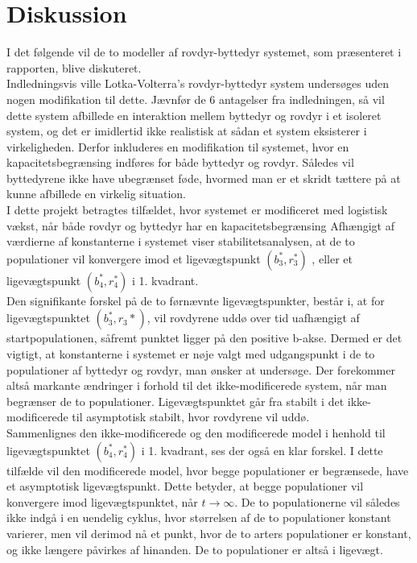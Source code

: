 \chapter{Diskussion}
I det følgende vil de to modeller af rovdyr-byttedyr systemet, som præsenteret i rapporten, blive diskuteret.\\
\hfill \break
Indledningsvis ville Lotka-Volterra's rovdyr-byttedyr system undersøges uden nogen modifikation til dette. Jævnfør de 6 antagelser fra indledningen, så vil dette system afbillede en interaktion mellem byttedyr og rovdyr i et isoleret system, og det er imidlertid ikke realistisk at sådan et system eksisterer i virkeligheden. Derfor inkluderes en modifikation til systemet, hvor en kapacitetsbegrænsing indføres for både byttedyr og rovdyr. Således vil byttedyrene ikke have ubegrænset føde, hvormed man er et skridt tættere på at kunne afbillede en virkelig situation. \\
\hfill \break
I dette projekt betragtes tilfældet, hvor systemet er modificeret med logistisk vækst, når både rovdyr og byttedyr har en kapacitetsbegrænsing
Afhængigt af værdierne af konstanterne i systemet viser stabilitetsanalysen, at de to populationer vil konvergere imod et ligevægtspunkt $(b_3^*,r_3^*)$ ,  eller et ligevægtspunkt $(b_4^*,r_4^*)$ i 1. kvadrant.\\
\hfill \break
Den signifikante forskel på de to førnævnte ligevægtspunkter, består i, at for ligevægtspunktet $(b_3^*, r_3*)$, vil rovdyrene uddø over tid uafhængigt af startpopulationen, såfremt punktet ligger på den positive b-akse. Dermed er det vigtigt, at konstanterne i systemet er nøje valgt med udgangspunkt i de to populationer af byttedyr og rovdyr, man ønsker at undersøge. Der forekommer altså markante ændringer i forhold til det ikke-modificerede system, når man begrænser de to populationer. Ligevægtspunktet går fra stabilt i det ikke-modificerede til asymptotisk stabilt, hvor rovdyrene vil uddø.\\
\hfill \break
Sammenlignes den ikke-modificerede og den modificerede model i henhold til ligevægtspunktet $(b_4^*,r_4^*)$ i 1. kvadrant, ses der også en klar forskel. I dette tilfælde vil den modificerede model, hvor begge populationer er begrænsede, have et asymptotisk ligevægtspunkt. Dette betyder, at begge populationer vil konvergere imod ligevægtspunktet, når $t \to \infty$. De to populationerne vil således ikke indgå i en uendelig cyklus, hvor størrelsen af de to populationer konstant varierer, men vil derimod nå et punkt, hvor de to arters populationer er konstant, og ikke længere påvirkes af hinanden. De to populationer er altså i ligevægt. \\
\hfill \break
